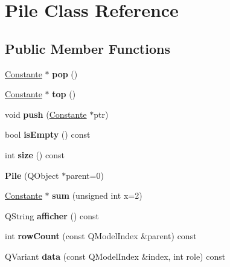 \hypertarget{class_pile}{\section{\-Pile \-Class \-Reference}
\label{class_pile}
}
\subsection*{\-Public \-Member \-Functions}
\begin{DoxyCompactItemize}
\item 
\hypertarget{class_pile_a2bbdc329f485cd017f8cbf88456ae68a}{\hyperlink{class_constante}{\-Constante} $\ast$ {\bfseries pop} ()}\label{class_pile_a2bbdc329f485cd017f8cbf88456ae68a}

\item 
\hypertarget{class_pile_a25c322d47a76d758565bdf9df2253411}{\hyperlink{class_constante}{\-Constante} $\ast$ {\bfseries top} ()}\label{class_pile_a25c322d47a76d758565bdf9df2253411}

\item 
\hypertarget{class_pile_a18a4d9a9b8013b36a5423817f9fb9049}{void {\bfseries push} (\hyperlink{class_constante}{\-Constante} $\ast$ptr)}\label{class_pile_a18a4d9a9b8013b36a5423817f9fb9049}

\item 
\hypertarget{class_pile_ae45e55f151180284728643cb9cfe4095}{bool {\bfseries is\-Empty} () const }\label{class_pile_ae45e55f151180284728643cb9cfe4095}

\item 
\hypertarget{class_pile_aaae1107e877f7094bdbd97839c731634}{int {\bfseries size} () const }\label{class_pile_aaae1107e877f7094bdbd97839c731634}

\item 
\hypertarget{class_pile_a07d95a908492bd45d1ac105aa78f9dcd}{{\bfseries \-Pile} (\-Q\-Object $\ast$parent=0)}\label{class_pile_a07d95a908492bd45d1ac105aa78f9dcd}

\item 
\hypertarget{class_pile_a91875101e0976f054d1db8869a00b11d}{\hyperlink{class_constante}{\-Constante} $\ast$ {\bfseries sum} (unsigned int x=2)}\label{class_pile_a91875101e0976f054d1db8869a00b11d}

\item 
\hypertarget{class_pile_a4964563804a254503d6413e5ba83d3c5}{\-Q\-String {\bfseries afficher} () const }\label{class_pile_a4964563804a254503d6413e5ba83d3c5}

\item 
\hypertarget{class_pile_a44545327a8d02ad9775a2c918ea5cdfc}{int {\bfseries row\-Count} (const \-Q\-Model\-Index \&parent) const }\label{class_pile_a44545327a8d02ad9775a2c918ea5cdfc}

\item 
\hypertarget{class_pile_ac9d6e388d3a98eb57a786f9bbec30952}{\-Q\-Variant {\bfseries data} (const \-Q\-Model\-Index \&index, int role) const }\label{class_pile_ac9d6e388d3a98eb57a786f9bbec30952}

\end{DoxyCompactItemize}

